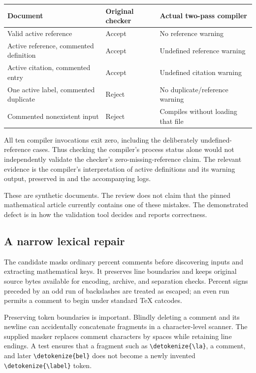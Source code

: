\documentclass[11pt,letterpaper]{article}
\newcommand{\code}[1]{\expandafter\nolinkurl\expandafter{\detokenize{#1}}}
\newcommand{\evidence}[1]{\texttt{\detokenize{#1}}}
\begin{document}
\begin{center}\small
\begin{tabularx}{\textwidth}{@{}Yp{1.3in}p{1.3in}@{}}
\toprule
Document & Original checker & Actual two-pass compiler\\
\midrule
Valid active reference & Accept & No reference warning\\
Active reference, commented definition & Accept & Undefined reference warning\\
Active citation, commented entry & Accept & Undefined citation warning\\
One active label, commented duplicate & Reject & No duplicate/reference warning\\
Commented nonexistent input & Reject & Compiles without loading that file\\
\bottomrule
\end{tabularx}
\end{center}

All ten compiler invocations exit zero, including the deliberately undefined-reference cases. Thus checking the compiler's process status alone would not independently validate the checker's zero-missing-reference claim. The relevant evidence is the compiler's interpretation of active definitions and its warning output, preserved in \evidence{evidence/tex-oracles.json} and the accompanying logs.

These are synthetic documents. The review does not claim that the pinned mathematical article currently contains one of these mistakes. The demonstrated defect is in how the validation tool decides and reports correctness.

\subsection{A narrow lexical repair}

The candidate masks ordinary percent comments before discovering inputs and extracting mathematical keys. It preserves line boundaries and keeps original source bytes available for encoding, archive, and separation checks. Percent signs preceded by an odd run of backslashes are treated as escaped; an even run permits a comment to begin under standard TeX catcodes.

Preserving token boundaries is important. Blindly deleting a comment and its newline can accidentally concatenate fragments in a character-level scanner. The supplied masker replaces comment characters by spaces while retaining line endings. A test ensures that a fragment such as \code{\la}, a comment, and later \code{bel} does not become a newly invented \code{\label} token.
\end{document}
